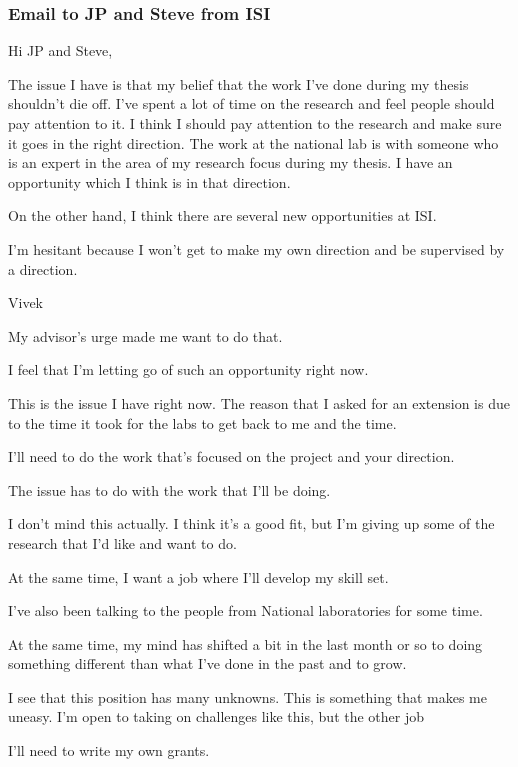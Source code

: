 \begin{frame} 

\frametitle{Email to JP and Steve from ISI} 
Hi JP and Steve, 

The issue I have is that my belief that the work I've done
during my thesis shouldn't die off. I've spent a lot of time on the research and
feel people should pay attention to it. I think I should pay attention
to the research and make sure it goes in the right direction. 
The work at the national lab is with someone who is an expert in the
area of my research focus during my thesis. I have
an opportunity which I think is in that direction.  

On the other hand, I think there are several new opportunities at
ISI. 

I'm hesitant because I won't get to make my own direction and be supervised by
a direction.

Vivek

My advisor's urge made me want to do that.  

I feel that I'm letting go of such an opportunity right now.  

This is the issue I have right now. 
The reason that I asked for an extension is due to the time it took
for the labs to get back to me and the time. 





I'll need to do the work that's focused 
on the project and your direction.  

The issue has to do with the work that I'll be doing. 

I don't mind this actually. I think it's a good fit, but I'm giving up some of the research that
I'd like and want to do.  


At the same time, I want a job where I'll develop my skill set. 

I've also been talking to the people from National laboratories for some time. 

At the same time, my mind has shifted a bit in the last month or so to
doing something different than what I've done in the past and to
grow. 

I see that this position has many unknowns. This is something that
makes me uneasy. I'm open to taking on challenges like this, but the
other job

I'll need to write my own grants. 

\end{frame} 




